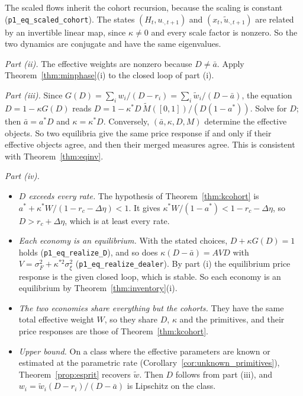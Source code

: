 The scaled flows inherit the cohort recursion, because the scaling is constant (\nolinkurl{p1_eq_scaled_cohort}). The states $(H_t,u_{\cdot,t+1})$ and $(x_t,\tilde u_{\cdot,t+1})$ are related by an invertible linear map, since $\kappa\ne0$ and every scale factor is nonzero. So the two dynamics are conjugate and have the same eigenvalues.

\emph{Part (ii).} The effective weights are nonzero because $D\ne\bar a$. Apply Theorem~\ref{thm:minphase}(i) to the closed loop of part (i).

\emph{Part (iii).} Since $G(D)=\sum_iw_i/(D-r_i)=\sum_i\tilde w_i/(D-\bar a)$, the equation $D=1-\kappa G(D)$ reads $D=1-\kappa^*D\,\tilde M([0,1])/(D(1-a^*))$. Solve for $D$; then $\bar a=a^*D$ and $\kappa=\kappa^*D$. Conversely, $(\bar a,\kappa,D,M)$ determine the effective objects. So two equilibria give the same price response if and only if their effective objects agree, and then their merged measures agree. This is consistent with Theorem~\ref{thm:eqinv}.

\emph{Part (iv).}
\begin{itemize}[itemsep=1pt,topsep=2pt]
\item \emph{$D$ exceeds every rate.} The hypothesis of Theorem~\ref{thm:kcohort} is $a^*+\kappa^*W/(1-r_c-\Delta\eta)<1$. It gives $\kappa^*W/(1-a^*)<1-r_c-\Delta\eta$, so $D>r_c+\Delta\eta$, which is at least every rate.
\item \emph{Each economy is an equilibrium.} With the stated choices, $D+\kappa G(D)=1$ holds (\nolinkurl{p1_eq_realize_D}), and so does $\kappa(D-\bar a)=AVD$ with $V=\sigma_F^2+\kappa^{*2}\sigma_\xi^2$ (\nolinkurl{p1_eq_realize_dealer}). By part (i) the equilibrium price response is the given closed loop, which is stable. So each economy is an equilibrium by Theorem~\ref{thm:inventory}(i).
\item \emph{The two economies share everything but the cohorts.} They have the same total effective weight $W$, so they share $D$, $\kappa$ and the primitives, and their price responses are those of Theorem~\ref{thm:kcohort}.
\item \emph{Upper bound.} On a class where the effective parameters are known or estimated at the parametric rate (Corollary~\ref{cor:unknown_primitives}), Theorem~\ref{prop:esprit} recovers $\tilde w$. Then $D$ follows from part (iii), and $w_i=\tilde w_i(D-r_i)/(D-\bar a)$ is Lipschitz on the class.
\end{itemize}

